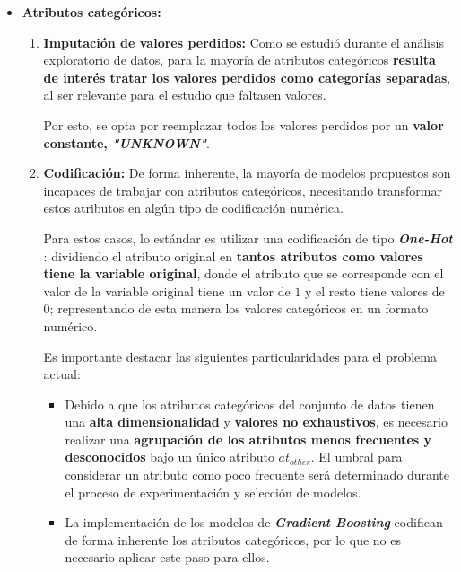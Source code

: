 \begin{itemize}[leftmargin=*, parsep=1pt, itemsep=1pt, topsep=4pt]
	\item \textbf{Atributos categóricos:}
	
	\begin{enumerate}
		\item \textbf{Imputación de valores perdidos:} Como se estudió durante el análisis exploratorio de datos, para la mayoría de atributos categóricos \textbf{resulta de interés tratar los valores perdidos como categorías separadas}, al ser relevante para el estudio que faltasen valores.
		
		Por esto, se opta por reemplazar todos los valores perdidos por un \textbf{valor constante, \textit{"UNKNOWN"}}.
		
		\item \textbf{Codificación:} De forma inherente, la mayoría de modelos propuestos son incapaces de trabajar con atributos categóricos, necesitando transformar estos atributos en algún tipo de codificación numérica.
		
		Para estos casos, lo estándar es utilizar una codificación de tipo \textbf{\textit{One-Hot}} \cite{GVK022791892}: dividiendo el atributo original en \textbf{tantos atributos como valores tiene la variable original}, donde el atributo que se corresponde con el valor de la variable original tiene un valor de $1$ y el resto tiene valores de $0$; representando de esta manera los valores categóricos en un formato numérico.
		
		Es importante destacar las siguientes particularidades para el problema actual:
		\begin{itemize}
			\item Debido a que los atributos categóricos del conjunto de datos tienen una \textbf{alta dimensionalidad} y \textbf{valores no exhaustivos}, es necesario realizar una \textbf{agrupación de los atributos menos frecuentes y desconocidos} bajo un único atributo $at_{other}$. El umbral para considerar un atributo como poco frecuente será determinado durante el proceso de experimentación y selección de modelos.
			\item La implementación de los modelos de \textbf{\textit{Gradient Boosting}} codifican de forma inherente los atributos categóricos, por lo que no es necesario aplicar este paso para ellos.
		\end{itemize}
		 
	\end{enumerate}
	

\end{itemize}
